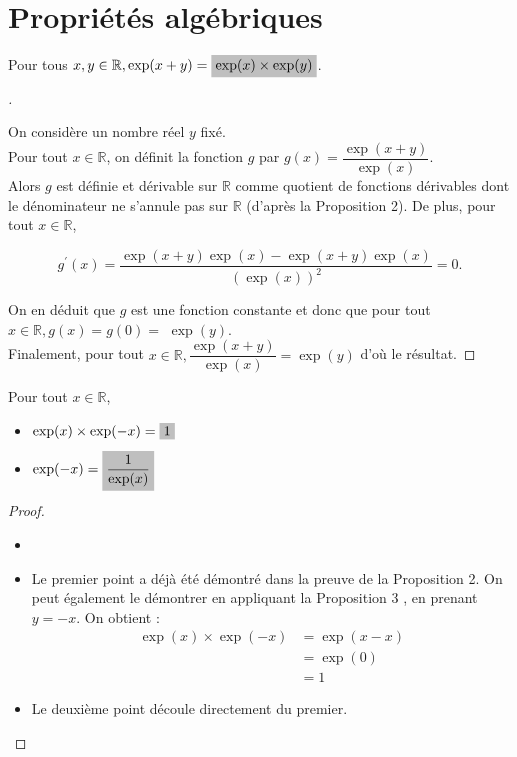 \documentclass[12pt]{article}
\theoremstyle{break}
\newenvironment{demo}[1][\proofname]{%
  \begin{proof}[#1]$ $\newline
  }{%
  \end{proof}
}
\begin{document}
\section{Propriétés algébriques}
\begin{proposition}{}{}
  Pour tous $x, y \in \mathbb{R}, \exp (x+y)=\hideM{\exp (x) \times \exp (y)}$.
\end{proposition}

\begin{demo}
  On considère un nombre réel $y$ fixé.\\
  Pour tout $x \in \mathbb{R}$, on définit la fonction $g$ par $g(x)=\dfrac{\exp (x+y)}{\exp (x)}$.\\
  Alors $g$ est définie et dérivable sur $\mathbb{R}$ comme quotient de fonctions dérivables dont le dénominateur ne s'annule pas sur $\mathbb{R}$ (d'après la Proposition 2). De plus, pour tout $x \in \mathbb{R}$,

  $$
  g^{\prime}(x)=\frac{\exp (x+y) \exp (x)-\exp (x+y) \exp (x)}{(\exp (x))^{2}}=0 .
  $$

  On en déduit que $g$ est une fonction constante et donc que pour tout $x \in \mathbb{R}, g(x)=g(0)=$ $\exp (y)$.\\
  Finalement, pour tout $x \in \mathbb{R}, \dfrac{\exp (x+y)}{\exp (x)}=\exp (y)$ d'où le résultat.
\end{demo}

\begin{proposition}{}{}
  Pour tout $x \in \mathbb{R}$,

  \begin{itemize}
    \item $\exp (x) \times \exp (-x)=\hideM{1}$
    \item $\exp (-x)=\hideM{\dfrac{1}{\exp (x)}}$
  \end{itemize}
\end{proposition}

\begin{proof}
  \begin{itemize}
    \item[]
    \item Le premier point a déjà été démontré dans la preuve de la Proposition 2. On peut également le démontrer en appliquant la Proposition 3 , en prenant $y=-x$. On obtient :
  $$
  \begin{aligned}
    \exp (x) \times \exp (-x) & =\exp (x-x) \\
    & =\exp (0) \\
    & =1
  \end{aligned}
  $$
    \item Le deuxième point découle directement du premier.
  \end{itemize}
\end{proof}
\end{document}
